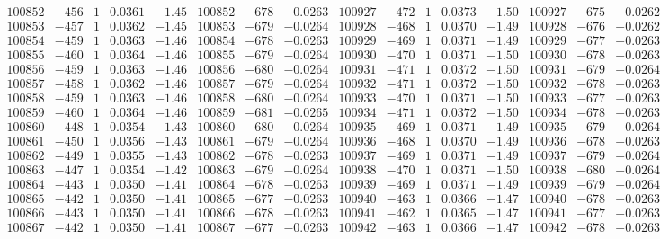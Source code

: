 \documentclass[11pt,reqno,a4letter]{article}
\numberwithin{figure}{section}
\numberwithin{table}{section}
\theoremstyle{plain}
\numberwithin{theorem}{section}
\theoremstyle{definition}
\begin{document}
\begin{table}[ht!]
\begin{equation*}
{\begin{array}{ccccc|ccc||ccccc|ccc}
100852 & -456 & 1 & 0.0361 & -1.45 & 100852 & -678 & -0.0263 & 100927 & -472 & 1 & 0.0373 & -1.50 & 100927 & -675 & -0.0262  \\
100853 & -457 & 1 & 0.0362 & -1.45 & 100853 & -679 & -0.0264 & 100928 & -468 & 1 & 0.0370 & -1.49 & 100928 & -676 & -0.0262  \\
100854 & -459 & 1 & 0.0363 & -1.46 & 100854 & -678 & -0.0263 & 100929 & -469 & 1 & 0.0371 & -1.49 & 100929 & -677 & -0.0263  \\
100855 & -460 & 1 & 0.0364 & -1.46 & 100855 & -679 & -0.0264 & 100930 & -470 & 1 & 0.0371 & -1.50 & 100930 & -678 & -0.0263  \\
100856 & -459 & 1 & 0.0363 & -1.46 & 100856 & -680 & -0.0264 & 100931 & -471 & 1 & 0.0372 & -1.50 & 100931 & -679 & -0.0264  \\
100857 & -458 & 1 & 0.0362 & -1.46 & 100857 & -679 & -0.0264 & 100932 & -471 & 1 & 0.0372 & -1.50 & 100932 & -678 & -0.0263  \\
100858 & -459 & 1 & 0.0363 & -1.46 & 100858 & -680 & -0.0264 & 100933 & -470 & 1 & 0.0371 & -1.50 & 100933 & -677 & -0.0263  \\
100859 & -460 & 1 & 0.0364 & -1.46 & 100859 & -681 & -0.0265 & 100934 & -471 & 1 & 0.0372 & -1.50 & 100934 & -678 & -0.0263  \\
100860 & -448 & 1 & 0.0354 & -1.43 & 100860 & -680 & -0.0264 & 100935 & -469 & 1 & 0.0371 & -1.49 & 100935 & -679 & -0.0264  \\
100861 & -450 & 1 & 0.0356 & -1.43 & 100861 & -679 & -0.0264 & 100936 & -468 & 1 & 0.0370 & -1.49 & 100936 & -678 & -0.0263  \\
100862 & -449 & 1 & 0.0355 & -1.43 & 100862 & -678 & -0.0263 & 100937 & -469 & 1 & 0.0371 & -1.49 & 100937 & -679 & -0.0264  \\
100863 & -447 & 1 & 0.0354 & -1.42 & 100863 & -679 & -0.0264 & 100938 & -470 & 1 & 0.0371 & -1.50 & 100938 & -680 & -0.0264  \\
100864 & -443 & 1 & 0.0350 & -1.41 & 100864 & -678 & -0.0263 & 100939 & -469 & 1 & 0.0371 & -1.49 & 100939 & -679 & -0.0264  \\
100865 & -442 & 1 & 0.0350 & -1.41 & 100865 & -677 & -0.0263 & 100940 & -463 & 1 & 0.0366 & -1.47 & 100940 & -678 & -0.0263  \\
100866 & -443 & 1 & 0.0350 & -1.41 & 100866 & -678 & -0.0263 & 100941 & -462 & 1 & 0.0365 & -1.47 & 100941 & -677 & -0.0263  \\
100867 & -442 & 1 & 0.0350 & -1.41 & 100867 & -677 & -0.0263 & 100942 & -463 & 1 & 0.0366 & -1.47 & 100942 & -678 & -0.0263  \\

\end{array}}
\end{equation*}
\end{table}
\end{document}
